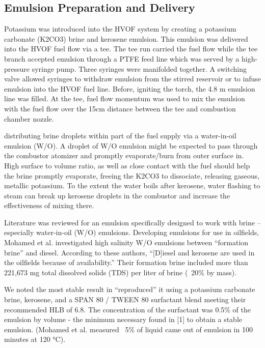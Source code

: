 \clearpage
\subsection{Emulsion Preparation and Delivery}

Potassium was introduced into the HVOF system by creating a potassium carbonate (K2CO3) brine and kerosene emulsion. This emulsion was delivered into the HVOF fuel flow via a tee. The tee run carried the fuel flow while the tee branch accepted emulsion through a PTFE feed line which was served by a high-pressure syringe pump. Three syringes were manifolded together. A switching valve allowed syringes to withdraw emulsion from the stirred reservoir or to infuse emulsion into the HVOF fuel line. Before, igniting the torch, the 4.8 m emulsion line was filled. At the tee, fuel flow momentum was used to mix the emulsion with the fuel flow over the 15cm distance between the tee and combustion chamber nozzle. 


distributing brine droplets within part of the fuel supply via a water-in-oil emulsion (W/O). A droplet of W/O emulsion might be expected to pass through the combustor atomizer and promptly evaporate/burn from outer surface in. High surface to volume ratio, as well as close contact with the fuel should help the brine promptly evaporate, freeing the K2CO3 to dissociate, releasing gaseous, metallic potassium. To the extent the water boils after kerosene, water flashing to steam can break up kerosene droplets in the combustor and increase the effectiveness of mixing there. 

Literature was reviewed for an emulsion specifically designed to work with brine – especially water-in-oil (W/O) emulsions.  Developing emulsions for use in oilfields, Mohamed et al.\cite{mohamedInfluenceSurfactantStructure2017a} investigated high salinity W/O emulsions between “formation brine” and diesel. According to these authors, “[D]iesel and kerosene are used in the oilfields because of availability.” Their formation brine included more than 221,673 mg total dissolved solids (TDS) per liter of brine (~20\% by mass).  

We noted the most stable result in \cite{mohamedInfluenceSurfactantStructure2017a} “reproduced” it using a potassium carbonate brine, kerosene, and a SPAN 80 / TWEEN 80 surfactant blend meeting their recommended HLB of 6.8. The concentration of the surfactant was 0.5\% of the emulsion by volume - the minimum necessary found in [1] to obtain a stable emulsion. (Mohamed et al. measured ~5\% of liquid came out of emulsion in 100 minutes at 120 °C).  

